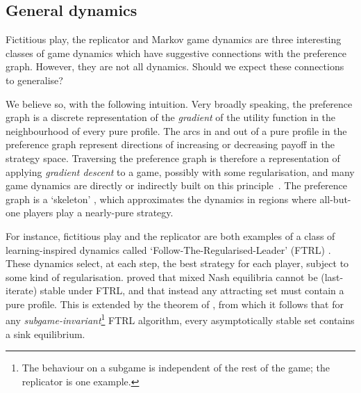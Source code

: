 \documentclass[preprint,authoryear]{elsarticle}
\begin{document}
\subsection{General dynamics}\label{sec: other dynamics}

Fictitious play, the replicator and Markov game dynamics are three interesting classes of game dynamics which have suggestive connections with the preference graph. However, they are not all dynamics. Should we expect these connections to generalise?

We believe so, with the following intuition. Very broadly speaking, the preference graph is a discrete representation of the \emph{gradient} of the utility function in the neighbourhood of every pure profile. The arcs in and out of a pure profile in the preference graph represent directions of increasing or decreasing payoff in the strategy space. Traversing the preference graph is therefore a representation of applying \emph{gradient descent} to a game, possibly with some regularisation, and many game dynamics are directly or indirectly built on this principle~\citep{mertikopoulos2016learning}. The preference graph is a `skeleton' \citep{biggar_graph_2023,biggar_replicator_2023,pangallo_best_2019}, which approximates the dynamics in regions where all-but-one players play a nearly-pure strategy.

For instance, fictitious play and the replicator are both examples of a class of learning-inspired dynamics called `Follow-The-Regularised-Leader' (FTRL) \citep{shalev2012online}. These dynamics select, at each step, the best strategy for each player, subject to some kind of regularisation. \cite{vlatakis-gkaragkounis_no-regret_2020} proved that mixed Nash equilibria cannot be (last-iterate) stable under FTRL, and that instead any attracting set must contain a pure profile. This is extended by the theorem of \cite{biggar_replicator_2023}, from which it follows that for any \emph{subgame-invariant}\footnote{The behaviour on a subgame is independent of the rest of the game; the replicator is one example.} FTRL algorithm, every asymptotically stable set contains a sink equilibrium. %
\end{document}
